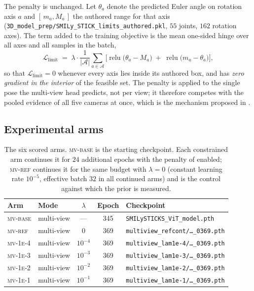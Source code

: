 \documentclass[11pt,a4paper]{article}
\newcommand{\lam}{\lambda}
\newcommand{\armref}{\textsc{mv-ref}}
\newcommand{\armbase}{\textsc{mv-base}}
\begin{document}
The penalty is unchanged. Let $\theta_{a}$ denote the predicted Euler angle on
rotation axis $a$ and $[\,m_a, M_a\,]$ the authored range for that axis
(\texttt{3D\_model\_prep/\allowbreak SMILy\_\allowbreak STICK\_\allowbreak limits\_\allowbreak authored.pkl},
$55$ joints,
$162$ rotation axes). The term added to the training objective is the mean
one-sided hinge over all axes and all samples in the batch,
\begin{equation}
  \mathcal{L}_{\text{limit}}
  \;=\;
  \lam \cdot
  \frac{1}{|\mathcal{A}|}\sum_{a \in \mathcal{A}}
  \Big[
    \operatorname{relu}\!\big(\theta_a - M_a\big)
    \;+\;
    \operatorname{relu}\!\big(m_a - \theta_a\big)
  \Big],
  \label{eq:penalty}
\end{equation}
so that $\mathcal{L}_{\text{limit}} = 0$ whenever every axis lies inside its
authored box, and  has \emph{zero gradient in the interior} of
the feasible set. The penalty is applied to the single pose the multi-view head
predicts, not per view; it therefore competes with the pooled evidence of all
five cameras at once, which is the mechanism proposed in
.

\subsection{Experimental arms}

\begin{table}[t]
\centering
\small
\caption{The six scored arms. \armbase{} is the starting checkpoint. Each
constrained arm continues it for $24$ additional epochs with the penalty of
 enabled; \armref{} continues it for the same budget with
$\lam = 0$ (constant learning rate $10^{-5}$, effective batch $32$ in all
continued arms) and is the control against which the prior is measured.}
\label{tab:arms}
\begin{tabular}{llccl}
\toprule
Arm & Mode & $\lam$ & Epoch & Checkpoint \\
\midrule
\armbase{}           & multi-view & ---       & 345 & \texttt{SMILySTICKS\_ViT\_model.pth} \\
\midrule
\armref{}            & multi-view & $0$       & 369 & \texttt{multiview\_refcont/\dots\_0369.pth} \\
\textsc{mv-1e-4}     & multi-view & $10^{-4}$ & 369 & \texttt{multiview\_lam1e-4/\dots\_0369.pth} \\
\textsc{mv-1e-3}     & multi-view & $10^{-3}$ & 369 & \texttt{multiview\_lam1e-3/\dots\_0369.pth} \\
\textsc{mv-1e-2}     & multi-view & $10^{-2}$ & 369 & \texttt{multiview\_lam1e-2/\dots\_0369.pth} \\
\textsc{mv-1e-1}     & multi-view & $10^{-1}$ & 369 & \texttt{multiview\_lam1e-1/\dots\_0369.pth} \\
\bottomrule
\end{tabular}
\end{table}
\end{document}
